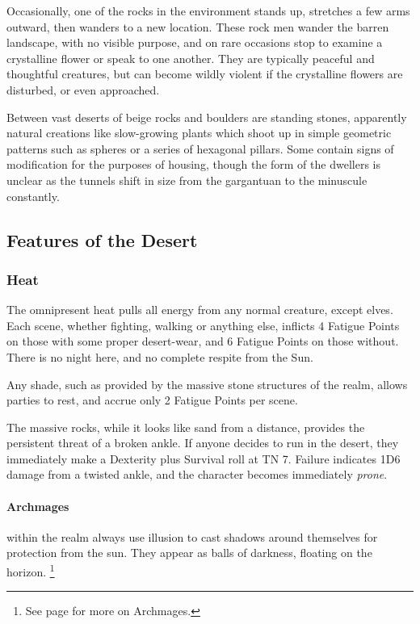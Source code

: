 \begin{multicols}{2}
Occasionally, one of the rocks in the environment stands up, stretches a few arms outward, then wanders to a new location.
These rock men wander the barren landscape, with no visible purpose, and on rare occasions stop to examine a crystalline flower or speak to one another.
They are typically peaceful and thoughtful creatures, but can become wildly violent if the crystalline flowers are disturbed, or even approached.

Between vast deserts of beige rocks and boulders are standing stones, apparently natural creations like slow-growing plants which shoot up in simple geometric patterns such as spheres or a series of hexagonal pillars.  Some contain signs of modification for the purposes of housing, though the form of the dwellers is unclear as the tunnels shift in size from the gargantuan to the minuscule constantly.

\subsection{Features of the Desert}

\subsubsection{Heat}

The omnipresent heat pulls all energy from any normal creature, except elves.
Each scene, whether fighting, walking or anything else, inflicts 4 Fatigue Points on those with some proper desert-wear, and 6 Fatigue Points on those without.
There is no night here, and no complete respite from the Sun.

Any shade, such as provided by the massive stone structures of the realm, allows parties to rest, and accrue only 2 Fatigue Points per scene.

The massive rocks, while it looks like sand from a distance, provides the persistent threat of a broken ankle.  If anyone decides to run in the desert, they immediately make a Dexterity plus Survival roll at TN 7.  Failure indicates 1D6 damage from a twisted ankle, and the character becomes immediately \emph{prone}.

\paragraph{Archmages} within the realm always use illusion to cast shadows around themselves for protection from the sun.
They appear as balls of darkness, floating on the horizon.%
\footnote{See page \pageref{archmage} for more on Archmages.}


\end{multicols}

